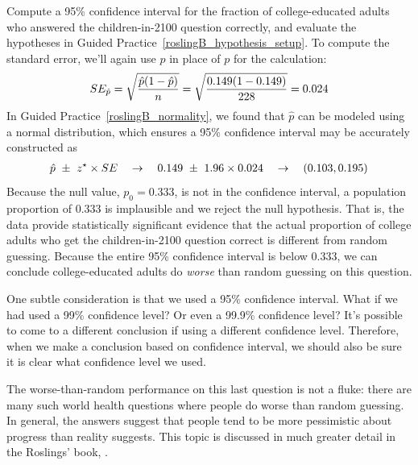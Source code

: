 \begin{examplewrap}
\begin{nexample}{Compute a 95\% confidence interval for the
    fraction of college-educated adults who answered the
    children-in-2100 question correctly, and evaluate the
    hypotheses in Guided
    Practice~\ref{roslingB_hypothesis_setup}.}
  To compute the standard error, we'll again use
  $\hat{p}$
  in place of $p$ for the calculation:
  \begin{align*}
  SE_{\hat{p}}
      = \sqrt{\frac{\hat{p}(1 - \hat{p})}{n}}
      = \sqrt{\frac{0.149{}(1 - 0.149{})}
          {228{}}}
      = 0.024{}
  \end{align*}
  In Guided Practice~\ref{roslingB_normality},
  we found that $\hat{p}$ can be modeled using
  a normal distribution,
  which ensures a 95\% confidence interval may be accurately
  constructed as
  \begin{align*}
  \hat{p}~\pm~z^{\star} \times SE
  \quad\to\quad
  0.149{}~\pm~1.96 \times 0.024{}
  \quad\to\quad
  (0.103, 0.195)
  \end{align*}
  Because the null value, $p_0 = 0.333$, is not in the
  confidence interval, a population proportion of 0.333
  is implausible and we reject the null hypothesis.
  That is, the data provide statistically significant
  evidence that the actual proportion of college adults
  who get the children-in-2100 question correct is
  different from random guessing. Because the entire
  95\% confidence interval
  is below 0.333, we can conclude college-educated adults
  do \emph{worse} than random guessing on this question.

  One subtle consideration is that we used a
  95\% confidence interval.
  What if we had used a 99\% confidence level?
  Or even a 99.9\% confidence level?
  It's possible to come to a different conclusion
  if using a different confidence level.
  Therefore, when we make a conclusion based
  on confidence interval, we should also be sure
  it is clear what confidence level we used.
\end{nexample}
\end{examplewrap}

The worse-than-random performance on this
last question is not a fluke:
there are many such world health questions where people
do worse than random guessing.
In general, the answers suggest that people tend to be
more pessimistic about progress than reality suggests.
This topic is discussed in much greater detail in
the Roslings' book,
\emph{}.



